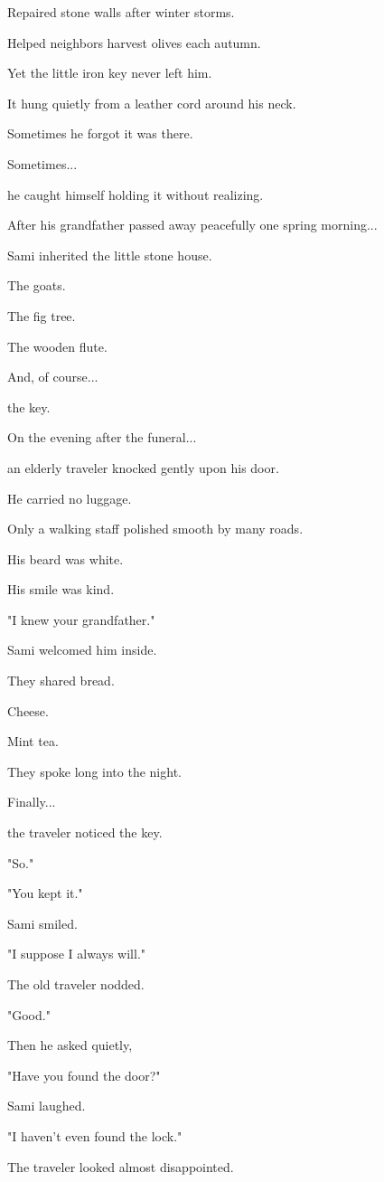 \documentclass[12pt,openany]{book}
\begin{document}
Repaired stone walls after winter storms.

Helped neighbors harvest olives each autumn.

Yet the little iron key never left him.

It hung quietly from a leather cord around his neck.

Sometimes he forgot it was there.

Sometimes...

he caught himself holding it without realizing.

After his grandfather passed away peacefully one spring morning...

Sami inherited the little stone house.

The goats.

The fig tree.

The wooden flute.

And, of course...

the key.

On the evening after the funeral...

an elderly traveler knocked gently upon his door.

He carried no luggage.

Only a walking staff polished smooth by many roads.

His beard was white.

His smile was kind.

"I knew your grandfather."

Sami welcomed him inside.

They shared bread.

Cheese.

Mint tea.

They spoke long into the night.

Finally...

the traveler noticed the key.

"So."

"You kept it."

Sami smiled.

"I suppose I always will."

The old traveler nodded.

"Good."

Then he asked quietly,

"Have you found the door?"

Sami laughed.

"I haven't even found the lock."

The traveler looked almost disappointed.
\end{document}

